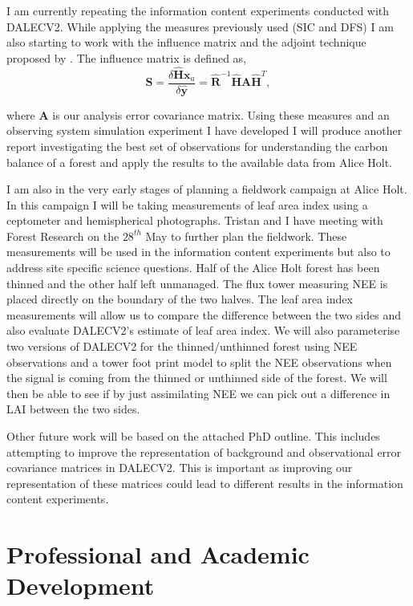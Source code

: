 \documentclass[11pt]{article}
\begin{document}
I am currently repeating the information content experiments conducted with DALECV2. While applying the measures previously used (SIC and DFS) I am also starting to work with the influence matrix \citep{Cardinali2004} and the adjoint technique proposed by \cite{Langland2004}. The influence matrix is defined as,
\begin{equation}
\textbf{S} = \frac{\delta \hat{\mathbf{H}}\textbf{x}_a}{\delta \hat{\textbf{y}}} = \hat{\textbf{R}}^{-1}\hat{\mathbf{H}}\textbf{A}\hat{\mathbf{H}}^{T},
\end{equation}

where $\textbf{A}$ is our analysis error covariance matrix. Using these measures and an observing system simulation experiment I have developed I will produce another report investigating the best set of observations for understanding the carbon balance of a forest and apply the results to the available data from Alice Holt. 

I am also in the very early stages of planning a fieldwork campaign at Alice Holt. In this campaign I will be taking measurements of leaf area index using a ceptometer and hemispherical photographs. Tristan and I have meeting with Forest Research on the $28^{th}$ May to further plan the fieldwork. These measurements will be used in the information content experiments but also to address site specific science questions. Half of the Alice Holt forest has been thinned and the other half left unmanaged.  The flux tower measuring NEE is placed directly on the boundary of the two halves. The leaf area index measurements will allow us to compare the difference between the two sides and also evaluate DALECV2's estimate of leaf area index. We will also parameterise two versions of DALECV2 for the thinned/unthinned forest using NEE observations and a tower foot print model to split the NEE observations when the signal is coming from the thinned or unthinned side of the forest. We will then be able to see if by just assimilating NEE we can pick out a difference in LAI between the two sides.

Other future work will be based on the attached PhD outline. This includes attempting to improve the representation of background and observational error covariance matrices in DALECV2. This is important as improving our representation of these matrices could lead to different results in the information content experiments.  



\section{Professional and Academic Development}
\end{document}
